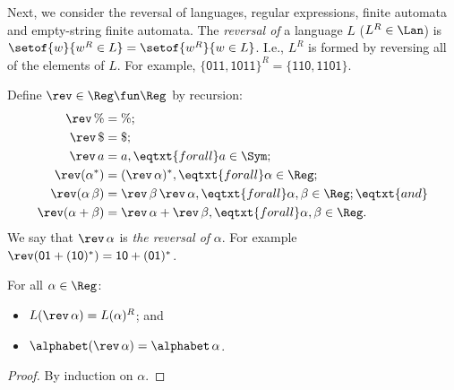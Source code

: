 Next, we consider the reversal of languages, regular expressions,
finite automata and empty-string finite automata.
The \emph{reversal of}
%
%
a language $L$ ($L^R\in\Lan$)
%
%
is $\setof{w}{w^R\in L} = \setof{w^R}{w\in L}$.  I.e., $L^R$ is formed
by reversing all of the elements of $L$.  For example, $\{\mathsf{011,
1011}\}^R = \{\mathsf{110, 1101}\}$.

Define $\rev\in\Reg\fun\Reg$ by recursion:
%
%
%
%
\begin{align*}
\rev\,\% &= \%; \\
\rev\,\$ &= \$; \\
\rev\,a &= a, \eqtxt{for all}a\in\Sym; \\
\rev(\alpha^*) &= (\rev\,\alpha)^*, \eqtxt{for all}\alpha\in\Reg;\\
\rev(\alpha\,\beta) &= \rev\,\beta\,\rev\,\alpha ,
\eqtxt{for all}\alpha,\beta\in\Reg; \eqtxt{and} \\
\rev(\alpha+\beta) &= \rev\,\alpha + \rev\,\beta ,
\eqtxt{for all}\alpha,\beta\in\Reg .
\end{align*}
We say that $\rev\,\alpha$ is \emph{the reversal of} $\alpha$.
For example $\rev(\mathsf{01+(10)^*}) = \mathsf{10 + (01)^*}$.

\begin{theorem}
\label{RegExpRev}
For all $\alpha\in\Reg$:
\begin{itemize}
\item $L(\rev\,\alpha) = L(\alpha)^R$; and

\item $\alphabet(\rev\,\alpha) = \alphabet\,\alpha$.
\end{itemize}
\end{theorem}

\begin{proof}
By induction on $\alpha$.
\end{proof}

